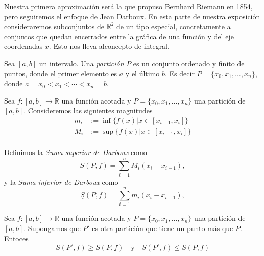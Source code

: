 Nuestra primera aproximación será la que propuso Bernhard Riemann en 1854, pero seguiremos  el enfoque de Jean Darboux. En esta parte de nuestra exposición consideraremos subconjuntos de $\mathbb{R}^2$ de un tipo especial, concretamente a conjuntos que quedan encerrados entre la gráfica de una función y del eje coordenadas $x$. Esto nos lleva alconcepto de integral. 


\begin{definicion}[Partición]{} Sea $[a,b]$ un intervalo. Una {\em partición} $P$ es un conjunto ordenado y finito de puntos, donde el primer elemento es $a$ y el último $b$. Es decir $P=\{x_0,x_1,\ldots,x_n\}$, donde $a=x_0<x_1<\cdots<x_n=b$. 
 
\end{definicion}




\begin{definicion}{} Sea $f:[a,b]\to\mathbb{R}$ una función acotada y $P=\{x_0,x_1,\ldots,x_n\}$ una partición de $[a,b]$. Consideremos las siguientes magnitudes
\begin{equation}\label{eq:Mi-mi}
 \begin{split}
    m_i&:=\inf\{f(x)| x\in [x_{i-1},x_i]\}\\
    M_i&:=\sup\{f(x)| x\in [x_{i-1},x_i]\}\\
 \end{split}
\end{equation}

Definimos la \emph{Suma superior de Darboux} como
\[
 \overline{S}(P,f)=\sum_{i=1}^nM_i(x_i-x_{i-1}),
\]
y la \emph{Suma inferior de Darboux} como
\[
 \underline{S}(P,f)=\sum_{i=1}^nm_i(x_i-x_{i-1}),
\] 
\end{definicion}

\begin{lema}{}  Sea $f:[a,b]\to\mathbb{R}$ una función acotada y $P=\{x_0,x_1,\ldots,x_n\}$ una partición de $[a,b]$. Supongamos que $P'$ es otra partición que tiene un punto más que $P$. Entoces
 \[
  \underline{S}(P',f)\geq \underline{S}(P,f)\quad\text{y}\quad \overline{S}(P',f)\leq \overline{S}(P,f)
 \]
\end{lema}

